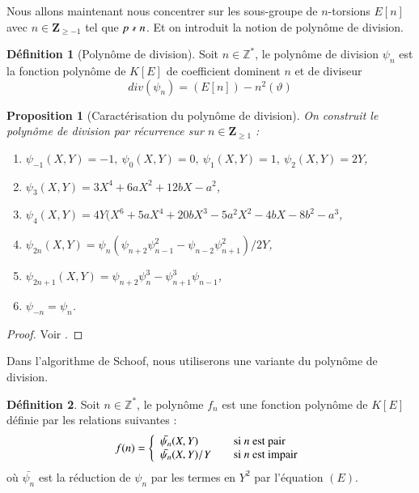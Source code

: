 \documentclass{article}%
\theoremstyle{plain}
\theoremstyle{definition}
\newtheorem{definition}{Définition}[section]
\theoremstyle{plain}
\newtheorem{proposition}{Proposition}[section]
\theoremstyle{plain}
\theoremstyle{remark}
\begin{document}
Nous allons maintenant nous concentrer sur les sous-groupe de $n$-torsions $E[n]$ avec $n\in\mathbf{Z}_{\geq -1}$ tel que $p\nshortmid n$. Et on introduit la notion de polynôme de division.

\begin{definition}[Polynôme de division]
Soit $n\in\mathbb{Z}^{*}$, le polynôme de division $\psi_{n}$ est la fonction polynôme de $K[E]$ de coefficient dominent $n$ et de diviseur $$div(\psi_{n})=(E[n])-n^{2}(\vartheta)$$
\end{definition}

\begin{proposition}[Caractérisation du polynôme de division]
On construit le polynôme de division par récurrence sur $n\in\mathbf{Z}_{\geq 1}$ :
\begin{enumerate}
\item $\psi_{-1}(X,Y)=-1,\ \psi_{0}(X,Y)=0,\ \psi_{1}(X,Y)=1,\ \psi_{2}(X,Y)=2Y$,
\item $\psi_{3}(X,Y)=3X^{4} + 6aX^{2} + 12bX - a^{2}$,
\item $\psi_{4}(X,Y)=4Y(X^{6} + 5aX^{4} + 20bX^{3} - 5a^{2}X^{2} - 4bX - 8b^{2} - a^{3}$,
\item $\psi_{2n}(X,Y)=\psi_{n}(\psi_{n+2}\psi_{n-1}^{2} - \psi_{n-2}\psi_{n+1}^{2})/2Y$,
\item $\psi_{2n+1}(X,Y)=\psi_{n+2}\psi_{n}^{3} - \psi_{n+1}^{3}\psi_{n-1}$,
\item $\psi_{-n}=\psi_{n}$.
\end{enumerate}
\end{proposition}

\begin{proof}
Voir \cite{ref4}.
\end{proof}

Dans l'algorithme de Schoof, nous utiliserons une variante du polynôme de division.

\begin{definition}
Soit $n\in\mathbb{Z}^{*}$, le polynôme $f_{n}$ est une fonction polynôme de $K[E]$ définie par les relations suivantes : 
$$
f(n) = \left\{
\begin{array}{l l}
  \bar{\psi_{n}}(X,Y) & \quad \text{si } n \text{ est pair}\\
  \bar{\psi_{n}}(X,Y)/Y & \quad \text{si } n \text{ est impair}\\ \end{array} \right.
$$
où $\bar{\psi_{n}}$ est la réduction de $\psi_{n}$ par les termes en $Y^{2}$ par l'équation $(E)$.
\end{definition}
\end{document}
